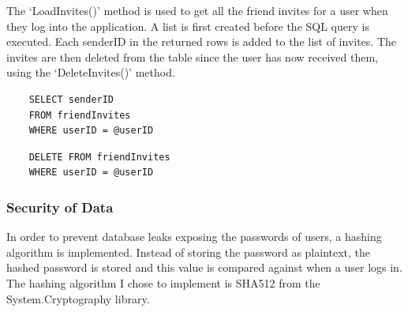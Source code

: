\documentclass{article}
\begin{document}
The `LoadInvites()' method is used to get all the friend invites for a user when they log into the application. A list is first created before the SQL query is executed. Each senderID in the returned rows is added to the list of invites. The invites are then deleted from the table since the user has now received them, using the `DeleteInvites()' method.
\begin{verbatim}
    SELECT senderID
    FROM friendInvites
    WHERE userID = @userID
\end{verbatim}
\begin{verbatim}
    DELETE FROM friendInvites
    WHERE userID = @userID
\end{verbatim}


\subsubsection{Security of Data}

In order to prevent database leaks exposing the passwords of users, a hashing algorithm is implemented. Instead of storing the password as plaintext, the hashed password is stored and this value is compared against when a user logs in. The hashing algorithm I chose to implement is SHA512 from the System.Cryptography library.
\end{document}
